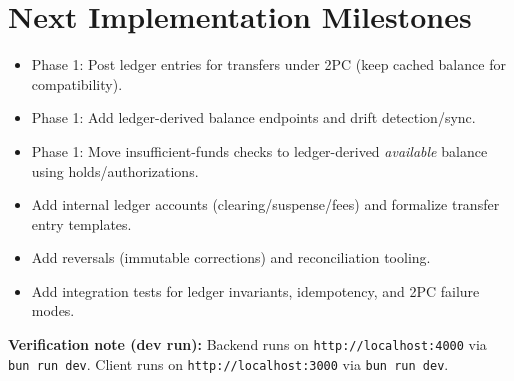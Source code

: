 \section{Next Implementation Milestones}
\begin{itemize}[nosep]
  \item[\(\checkmark\)] Phase 1: Post ledger entries for transfers under 2PC (keep cached balance for compatibility).
  \item[\(\checkmark\)] Phase 1: Add ledger-derived balance endpoints and drift detection/sync.
  \item[\(\checkmark\)] Phase 1: Move insufficient-funds checks to ledger-derived \emph{available} balance using holds/authorizations.
  \item[\(\checkmark\)] Add internal ledger accounts (clearing/suspense/fees) and formalize transfer entry templates.
  \item[\(\checkmark\)] Add reversals (immutable corrections) and reconciliation tooling.
  \item[\(\checkmark\)] Add integration tests for ledger invariants, idempotency, and 2PC failure modes.
\end{itemize}

\noindent\textbf{Verification note (dev run):} Backend runs on \texttt{http://localhost:4000} via \texttt{bun run dev}. Client runs on \texttt{http://localhost:3000} via \texttt{bun run dev}.
